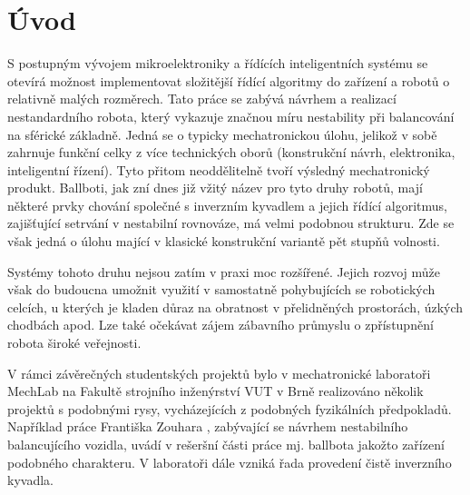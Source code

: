\chapter{Úvod}
S postupným vývojem mikroelektroniky a řídících inteligentních systému se otevírá možnost implementovat složitější řídící algoritmy do zařízení a robotů o relativně malých rozměrech. Tato práce se zabývá návrhem a realizací nestandardního robota, který vykazuje značnou míru nestability při balancování na sférické základně. Jedná se o typicky mechatronickou úlohu, jelikož v sobě zahrnuje funkční celky z více technických oborů (konstrukční návrh, elektronika, inteligentní řízení). Tyto přitom neoddělitelně tvoří výsledný mechatronický produkt. Ballboti, jak zní dnes již vžitý název pro tyto druhy robotů, mají některé prvky chování společné s inverzním kyvadlem a jejich řídící algoritmus, zajišťující setrvání v nestabilní rovnováze, má velmi podobnou strukturu. Zde se však jedná o úlohu mající v klasické konstrukční variantě pět stupňů volnosti.

	Systémy tohoto druhu nejsou zatím v praxi moc rozšířené. Jejich rozvoj může však do budoucna umožnit využití v samostatně pohybujících se robotických celcích, u kterých je kladen důraz na obratnost v přelidněných prostorách, úzkých chodbách apod. Lze také očekávat zájem zábavního průmyslu o zpřístupnění robota široké veřejnosti.
	
	V rámci závěrečných studentských projektů bylo v mechatronické laboratoři MechLab na Fakultě strojního inženýrství VUT v Brně realizováno několik projektů s podobnými rysy, vycházejících z podobných fyzikálních předpokladů. Například práce Františka Zouhara \cite{zouhar}, zabývající se návrhem nestabilního balancujícího vozidla, uvádí v rešeršní části práce mj. ballbota jakožto zařízení podobného charakteru. V laboratoři dále vzniká řada provedení čistě inverzního kyvadla.

